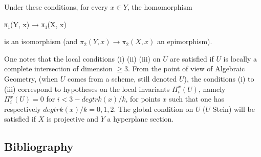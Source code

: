 \documentclass[
]{article}
\newenvironment{Shaded}{}{}
\newcommand{\NormalTok}[1]{#1}
\begin{document}
Under these conditions, for every \(x \in Y\), the homomorphism

\begin{Shaded}
\begin{Highlighting}[]
\NormalTok{π₁(Y, x) → π₁(X, x)}
\end{Highlighting}
\end{Shaded}

is an isomorphism (and \(\pi_{2}(Y, x) \to \pi_{2}(X, x)\) an
epimorphism).

One notes that the local conditions (i) (ii) (iii) on \(U\) are
satisfied if \(U\) is locally a complete intersection of dimension
\(\geqslant 3\). From the point of view of Algebraic Geometry, (when
\(U\) comes from a scheme, still denoted \(U\)), the conditions (i) to
(iii) correspond to hypotheses on the local invariants
\(\Pi^{x}_{i}(U)\), namely \(\Pi^{x}_{i}(U) = 0\) for
\(i < 3 - deg tr k(x)/k\), for points \(x\) such that one has
respectively \(deg tr k(x)/k = 0, 1, 2\). The global condition on \(U\)
(\(U\) Stein) will be satisfied if \(X\) is projective and \(Y\) a
hyperplane section.

\subsection{Bibliography}\label{bibliography-3}
\end{document}
